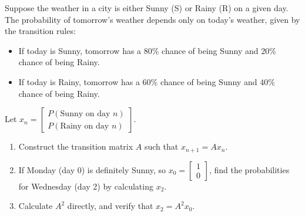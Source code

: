 \begin{problem}
Suppose the weather in a city is either Sunny (S) or Rainy (R) on a given day. The probability of tomorrow's weather depends only on today's weather, given by the transition rules:
\begin{itemize}
  \item If today is Sunny, tomorrow has a $80\%$ chance of being Sunny and $20\%$ chance of being Rainy.
  \item If today is Rainy, tomorrow has a $60\%$ chance of being Sunny and $40\%$ chance of being Rainy.
\end{itemize}

\begin{center}
\end{center}

Let $x_n = \begin{bmatrix} P(\text{Sunny on day } n) \\ P(\text{Rainy on day } n) \end{bmatrix}$. 

\begin{enumerate}[label=\textbf{(\alph*)}]
    \item Construct the transition matrix $A$ such that $x_{n+1} = A x_n$.
    \item If Monday (day 0) is definitely Sunny, so $x_0 = \begin{bmatrix} 1 \\ 0 \end{bmatrix}$, find the probabilities for Wednesday (day 2) by calculating $x_2$.
    \item Calculate $A^2$ directly, and verify that $x_2 = A^2 x_0$.
\end{enumerate}
\end{problem}

